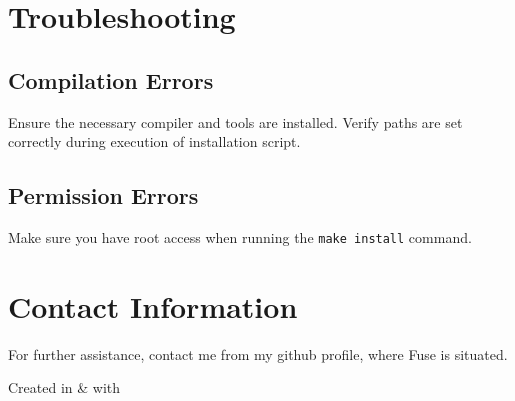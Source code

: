\documentclass[a4paper,12pt]{article}
\begin{document}
\section*{Troubleshooting}
\subsection*{Compilation Errors}
Ensure the necessary compiler and tools are installed. Verify paths are set correctly during execution of installation script.

\subsection*{Permission Errors}
Make sure you have root access when running the \texttt{make install} command.

\section*{Contact Information}
For further assistance, contact me from my github profile, where Fuse is situated.

\vspace*{\fill}

\begin{center}Created in  \& 
	with \end{center}
\end{document}
